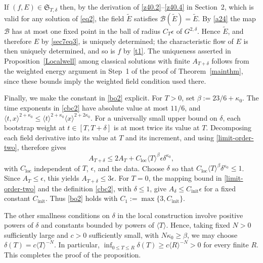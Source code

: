 \documentclass[reqno,11pt]{amsart}
\numberwithin{equation}{section}
\begin{document}
	If $(f,E)\in\mathfrak S_{T,\delta}$ then, by the derivation of
	\eqref{z40.2}--\eqref{z40.4} in Section~2, which is valid for any solution of \eqref{eq2},
	the field $\widetilde{E}$ satisfies $\mathcal B(\widetilde E)=\widetilde E$. By \eqref{a24}
	the map $\mathcal B$ has at most one fixed point in the ball of radius $C_T\epsilon$ of
	$G^{2,\delta}$. Hence $\widetilde E$,
	and therefore $E$ by \eqref{sec7eq3}, is uniquely determined; the characteristic flow of $E$
	is then uniquely determined, and so is $f$ by \eqref{t1}.
	The uniqueness asserted in Proposition~\ref{Localwell} among classical solutions
	with finite $A_{T+\delta}$ follows from the weighted energy argument in
	Step~1 of the proof of Theorem~\ref{mainthm}, since these bounds imply
	the weighted field condition used there.
	
	Finally, we make the constant in \eqref{bo2} explicit.
	For $T>0$, set $\beta:=23/6+\kappa_0$. The time exponents in
	\eqref{cbc2} have absolute value at most $11/6$, and
	$\langle t,x\rangle^{2+\kappa_0}
	\leq\langle t\rangle^{2+\kappa_0}
	\langle x\rangle^{2+2\kappa_0}.$
	For a universally small upper bound on $\delta$, each bootstrap
	weight at $t\in[T,T+\delta]$ is at most twice its value at $T$.
	Decomposing each field derivative into its value at $T$ and its
	increment, and using \eqref{limit-order-two}, therefore gives
	\[
	A_{T+\delta}\leq2A_T+
	C_{\mathrm{loc}}\langle T\rangle^\beta
	\epsilon\delta^{\kappa_0},
	\]
	with $C_{\mathrm{loc}}$ independent of $T$, $\epsilon$, and the data.
	Choose $\delta$ so that
	$C_{\mathrm{loc}}\langle T\rangle^\beta\delta^{\kappa_0}\leq1$.
	Since $A_T\leq\epsilon$, this yields $A_{T+\delta}\leq3\epsilon$.
	For $T=0$, the mapping bound in \eqref{limit-order-two} and the
	definition \eqref{cbc2}, with $\delta\leq1$, give
	$A_\delta\leq C_{\mathrm{init}}\epsilon$ for a fixed constant
	$C_{\mathrm{init}}$. Thus \eqref{bo2} holds with
	$C_1:=\max\{3,C_{\mathrm{init}}\}$.

	The other smallness conditions on $\delta$ in the local construction
	involve positive powers of $\delta$ and constants bounded by powers
	of $\langle T\rangle$. Hence, taking fixed $N>0$ sufficiently large
	and $c>0$ sufficiently small, with $N\kappa_0\geq\beta$, we may choose $
	\delta(T)=c\langle T\rangle^{-N}.$
	In particular, $\inf_{0\leq T\leq R}\delta(T)
	\geq c\langle R\rangle^{-N}>0$ for every finite $R$.
	This completes the proof of the proposition.
\end{document}
